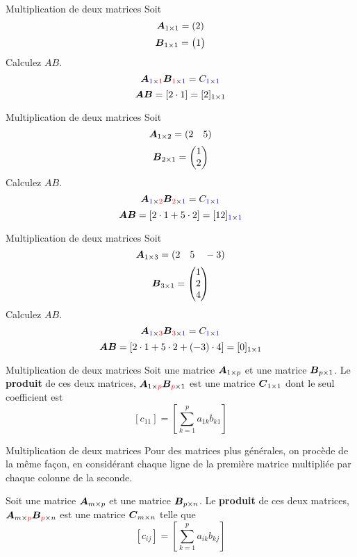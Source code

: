\documentclass[french]{beamer}
\begin{document}
\begin{frame}{Multiplication de deux matrices}
Soit
\[
\boldsymbol{A}_{1 \times 1} = (2)
\]
\[
\boldsymbol{B}_{1\times 1} = \begin{pmatrix}
1
\end{pmatrix}
\]
Calculez $AB$.
\[
\boldsymbol{A}_{\textcolor{blue}{1} \times \textcolor{red}{1}}\boldsymbol{B}_{\textcolor{red}{1} \times \textcolor{blue}{1}} =  C_{\textcolor{blue}{1} \times \textcolor{blue}{1}}
\]
\[
\boldsymbol{A}\boldsymbol{B} = [2 \cdot 1] = [2]_{1\times 1}
\]
\end{frame}

\begin{frame}{Multiplication de deux matrices}
Soit
\[
\boldsymbol{A}_{1 \times 2} = (2 \quad 5)
\]
\[
\boldsymbol{B}_{2\times 1} = \begin{pmatrix}
1 \\ 2
\end{pmatrix}
\]
Calculez $AB$.
\[
\boldsymbol{A}_{\textcolor{blue}{1} \times \textcolor{red}{2}}\boldsymbol{B}_{\textcolor{red}{2} \times \textcolor{blue}{1}} = C_{\textcolor{blue}{1} \times \textcolor{blue}{1}}
\]
\[
\boldsymbol{A}\boldsymbol{B} = [2 \cdot 1 + 5\cdot 2] = [12]_{\textcolor{blue}{1}\times \textcolor{blue}{1}}
\]
\end{frame}

\begin{frame}{Multiplication de deux matrices}
Soit
\[
\boldsymbol{A}_{1 \times 3} = (2 \quad 5 \quad -3)
\]
\[
\boldsymbol{B}_{3\times 1} = \begin{pmatrix}
1 \\ 2 \\ 4
\end{pmatrix}
\]
Calculez $AB$.
\[
\boldsymbol{A}_{\textcolor{blue}{1} \times \textcolor{red}{3}}\boldsymbol{B}_{\textcolor{red}{3} \times \textcolor{blue}{1}}
= C_{\textcolor{blue}{1} \times \textcolor{blue}{1}}
\]
\[
\boldsymbol{A}\boldsymbol{B} = [2 \cdot 1 + 5\cdot 2 + (-3)\cdot 4] = [0]_{1\times 1}
\]
\end{frame}

\begin{frame}{Multiplication de deux matrices}
Soit une matrice $\boldsymbol{A}_{1\times p}$ et une matrice $\boldsymbol{B}_{p\times 1}$.  
Le \textbf{produit} de ces deux matrices, 
$\boldsymbol{A}_{1\times\textcolor{red}{p}}\boldsymbol{B}_{\textcolor{red}{p}\times 1}$ est une matrice $\boldsymbol{C}_{1\times 1}$ dont le seul coefficient est
\huge
\[
[c_{11}] = \left[\sum_{k=1}^{p} a_{1k} b_{k1}\right]
\]
\end{frame}


\begin{frame}{Multiplication de deux matrices}
Pour des matrices plus générales, on procède de la même façon, en considérant chaque ligne
de la première matrice multipliée par chaque colonne de la seconde.\vfill

Soit une matrice $\boldsymbol{A}_{m\times p}$ et une matrice $\boldsymbol{B}_{p\times n}$.  
Le \textbf{produit} de ces deux matrices, 
$\boldsymbol{A}_{m\times\textcolor{red}{p}}\boldsymbol{B}_{\textcolor{red}{p}\times n}$ est une matrice $\boldsymbol{C}_{m\times n}$ telle que
\huge
\[
[c_{ij}] = \left[\sum_{k=1}^{p} a_{ik} b_{kj}\right]
\]
\end{frame}
\end{document}
